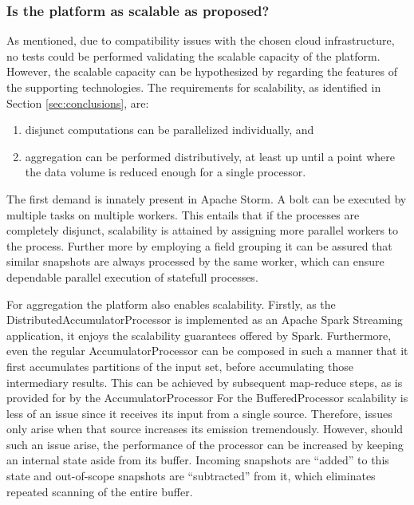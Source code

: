 \subsubsection{Is the platform as scalable as proposed?}
As mentioned, due to compatibility issues with the chosen cloud infrastructure, no tests could be performed validating the scalable capacity of the platform. However, the scalable capacity can be hypothesized by regarding the features of the supporting technologies. The requirements for scalability, as identified in Section \ref{sec:conclusions}, are:
\begin{enumerate}
\nospace
\item disjunct computations can be parallelized individually, and
\item aggregation can be performed distributively, at least up until a point where the data volume is reduced enough for a single processor.
\end{enumerate}
The first demand is innately present in Apache Storm. A bolt can be executed by multiple tasks on multiple workers. This entails that if the processes are completely disjunct, scalability is attained by assigning more parallel workers to the process. Further more by employing a field grouping it can be assured that similar snapshots are always processed by the same worker, which can ensure dependable parallel execution of statefull processes.

For aggregation the platform also enables scalability. Firstly, as the DistributedAccumulatorProcessor is implemented as an Apache Spark Streaming application, it enjoys the scalability guarantees offered by Spark. Furthermore, even the regular AccumulatorProcessor can be composed in such a manner that it first accumulates partitions of the input set, before accumulating those intermediary results. This can be achieved by subsequent map-reduce steps, as is provided for by the AccumulatorProcessor For the BufferedProcessor scalability is less of an issue since it receives its input from a single source. Therefore, issues only arise when that source increases its emission tremendously. However, should such an issue arise, the performance of the processor can be increased by keeping an internal state aside from its buffer. Incoming snapshots are ``added'' to this state and out-of-scope snapshots are ``subtracted'' from it, which eliminates repeated scanning of the entire buffer.

